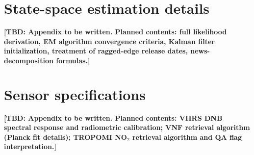 \documentclass[11pt,letterpaper]{article}
\newcommand{\tbdline}[1]{\textcolor{yellow!60!black}{\textbf{[TBD: #1]}}}
\begin{document}
\section{State-space estimation details}
\label{app:state_space}

\tbdline{Appendix to be written. Planned contents: full likelihood derivation, EM algorithm convergence criteria, Kalman filter initialization, treatment of ragged-edge release dates, news-decomposition formulas.}

\section{Sensor specifications}
\label{app:sensors}

\tbdline{Appendix to be written. Planned contents: VIIRS DNB spectral response and radiometric calibration; VNF retrieval algorithm (Planck fit details); TROPOMI NO$_2$ retrieval algorithm and QA flag interpretation.}

\newpage

\end{document}
